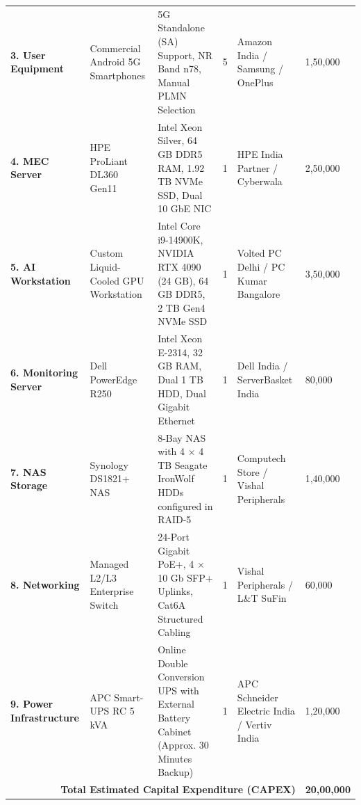 \documentclass[12pt,a4paper]{article}\usepackage[a4paper,margin=1in]{geometry}\usepackage{graphicx}\usepackage{longtable}\usepackage{booktabs}\usepackage{hyperref}\usepackage{enumitem}\usepackage{amsmath}\usepackage{tikz}\usepackage{pgfgantt}\usepackage{setspace}\setstretch{1.15}\usetikzlibrary{positioning,arrows.meta,shapes.geometric}
\begin{document}
\begin{longtable}{
		p{1.7cm}
		p{2cm}
		p{4cm}
		c
		p{2.8cm}
		p{3 cm}
	}
	\textbf{3. User Equipment} &
	Commercial Android 5G Smartphones &
	5G Standalone (SA) Support, NR Band n78, Manual PLMN Selection &
	5 &
	Amazon India / Samsung / OnePlus &
	1,50,000 \\
	
	\addlinespace
	
	\textbf{4. MEC Server} &
	HPE ProLiant DL360 Gen11 &
	Intel Xeon Silver, 64 GB DDR5 RAM, 1.92 TB NVMe SSD, Dual 10 GbE NIC &
	1 &
	HPE India Partner / Cyberwala &
	2,50,000 \\
	
	\addlinespace
	
	\textbf{5. AI Workstation} &
	Custom Liquid-Cooled GPU Workstation &
	Intel Core i9-14900K, NVIDIA RTX 4090 (24 GB), 64 GB DDR5, 2 TB Gen4 NVMe SSD &
	1 &
	Volted PC Delhi / PC Kumar Bangalore &
	3,50,000 \\
	
	\addlinespace
	
	\textbf{6. Monitoring Server} &
	Dell PowerEdge R250 &
	Intel Xeon E-2314, 32 GB RAM, Dual 1 TB HDD, Dual Gigabit Ethernet &
	1 &
	Dell India / ServerBasket India &
	80,000 \\
	
	\addlinespace
	
	\textbf{7. NAS Storage} &
	Synology DS1821+ NAS &
	8-Bay NAS with 4 $\times$ 4 TB Seagate IronWolf HDDs configured in RAID-5 &
	1 &
	Computech Store / Vishal Peripherals &
	1,40,000 \\
	
	\addlinespace
	
	\textbf{8. Networking} &
	Managed L2/L3 Enterprise Switch &
	24-Port Gigabit PoE+, 4 $\times$ 10 Gb SFP+ Uplinks, Cat6A Structured Cabling &
	1 &
	Vishal Peripherals / L\&T SuFin &
	60,000 \\
	
	\addlinespace
	
	\textbf{9. Power Infrastructure} &
	APC Smart-UPS RC 5 kVA &
	Online Double Conversion UPS with External Battery Cabinet (Approx. 30 Minutes Backup) &
	1 &
	APC Schneider Electric India / Vertiv India &
	1,20,000 \\
	
	
	\midrule
	
	\multicolumn{5}{r}{\textbf{Total Estimated Capital Expenditure (CAPEX)}} &
	\textbf{20,00,000} \\
	
	\bottomrule
	
\end{longtable}
		
\end{document}
